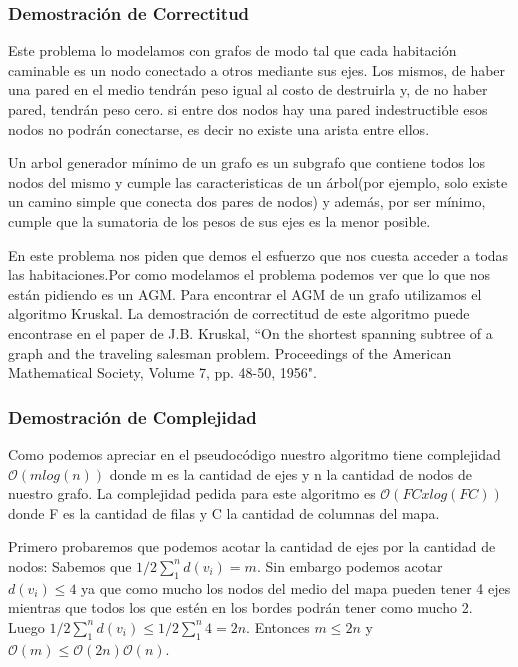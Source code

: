 \documentclass[spanish,12pt]{article}
\begin{document}
\subsubsection{Demostración de Correctitud}

Este problema lo modelamos con grafos de modo tal que cada habitación caminable es un nodo conectado a otros mediante sus ejes. Los mismos, de haber una pared en el medio tendrán peso igual al costo de destruirla y, de no haber pared, tendrán peso cero. si entre dos nodos hay una pared indestructible esos nodos no podrán conectarse, es decir no existe una arista entre ellos.

Un arbol generador mínimo de un grafo es un subgrafo que contiene todos los nodos del mismo y cumple las caracteristicas de un árbol(por ejemplo, solo existe un camino simple que conecta dos pares de nodos) y además, por ser mínimo, cumple que la sumatoria de los pesos de sus ejes es la menor posible.

En este problema nos piden que demos el esfuerzo que nos cuesta acceder a todas las habitaciones.Por como modelamos el problema podemos ver que lo que nos están pidiendo es un AGM. Para encontrar el AGM de un grafo utilizamos el algoritmo Kruskal. La demostración de correctitud de este algoritmo puede encontrase en el paper de  J.B. Kruskal, ``On the shortest spanning subtree of a graph and the traveling salesman problem. Proceedings of the American Mathematical Society, Volume 7, pp. 48-50, 1956".



\subsubsection{Demostración de Complejidad}


Como podemos apreciar en el pseudocódigo nuestro algoritmo tiene complejidad $\mathcal{O}(mlog(n))$ donde m es la cantidad de ejes y n la cantidad de nodos de nuestro grafo.
La complejidad pedida para este algoritmo es $\mathcal{O}(FCxlog(FC))$ donde F es la cantidad de filas y C la cantidad de columnas del mapa.


Primero probaremos que podemos acotar la cantidad de ejes por la cantidad de nodos:
Sabemos que $1/2  \sum_{1}^{n}d(v_{i}) =m $. Sin embargo podemos acotar $d(v_{i}) \leq 4$ ya que como mucho los nodos del medio del mapa pueden tener 4 ejes mientras que todos los que estén en los bordes podrán tener como mucho 2. Luego $1/2  \sum_{1}^{n}{d(v_{i})} \leq 1/2 \sum_{1}^{n}{4} = 2n$. Entonces $m \leq 2n$ y $\mathcal{O}(m) \leq \mathcal{O}(2n) \mathcal{O}(n)$.
\end{document}
